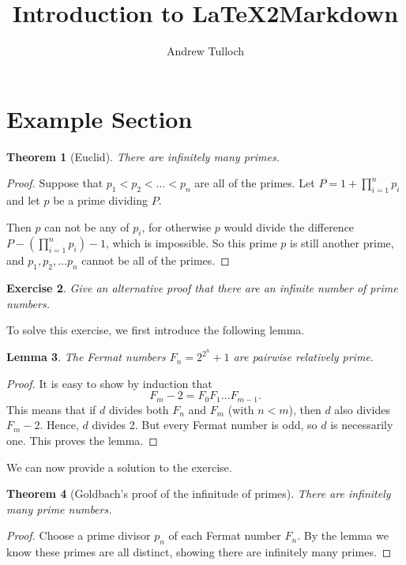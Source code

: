 \documentclass[12pt]{amsart}
\title{Introduction to LaTeX2Markdown}
\author{Andrew Tulloch}
\theoremstyle{plain}%
\newtheorem{thm}{Theorem}[section]
\newtheorem{lem}[thm]{Lemma}
\newtheorem{exer}[thm]{Exercise}
\begin{document}
\maketitle

\section{Example Section}
\begin{thm}[Euclid]
    There are infinitely many primes.
\end{thm}

\begin{proof}
    Suppose that $p_1 < p_2 < \dots < p_n$ are all of the primes. Let $P = 1 + \prod_{i=1}^n p_i$ and let $p$ be a prime dividing $P$.
    
    Then $p$ can not be any of $p_i$, for otherwise $p$ would divide the difference $P - \left(\prod_{i=1}^n p_i \right) - 1$, which is impossible. So this prime $p$ is still another prime, and $p_1, p_2, \dots p_n$ cannot be all of the primes.
\end{proof}

\begin{exer}
    Give an alternative proof that there are an infinite number of prime numbers.
\end{exer}

To solve this exercise, we first introduce the following lemma.
\begin{lem}
    The Fermat numbers $F_n = 2^{2^{n}} + 1$ are pairwise relatively prime.
\end{lem}

\begin{proof}
    It is easy to show by induction that \[
    F_m - 2 = F_0 F_1 \dots F_{m-1}.
    \]  This means that if $d$ divides both $F_n$ and $F_m$ (with $n < m$), then $d$ also divides $F_m - 2$.  Hence, $d$ divides 2.  But every Fermat number is odd, so $d$ is necessarily one.  This proves the lemma.
\end{proof}

We can now provide a solution to the exercise.

\begin{thm}[Goldbach's proof of the infinitude of primes]
    There are infinitely many prime numbers.
\end{thm}

\begin{proof}
    Choose a prime divisor $p_n$ of each Fermat number $F_n$.  By the lemma we know these primes are all distinct, showing there are infinitely many primes.
\end{proof}
\end{document}
